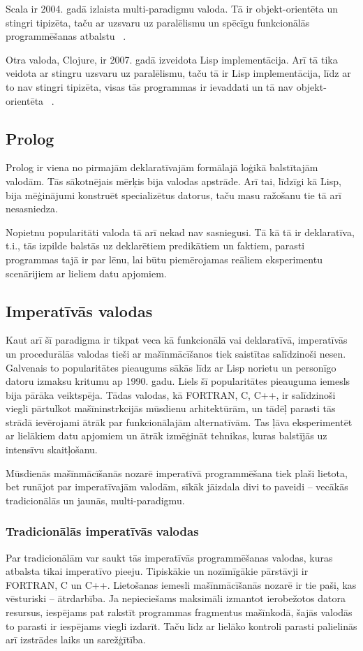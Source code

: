 \documentclass{ludis}
\begin{document}
Scala ir 2004. gadā izlaista multi-paradigmu valoda. Tā ir objekt-orientēta un stingri tipizēta, taču ar uzsvaru uz paralēlismu un spēcīgu funkcionālās programmēšanas atbalstu ~\cite{scala_org}.

Otra valoda, Clojure, ir 2007. gadā izveidota Lisp implementācija. Arī tā tika veidota ar stingru uzsvaru uz paralēlismu, taču tā ir Lisp implementācija, līdz ar to nav stingri tipizēta, visas tās programmas ir ievaddati un tā nav objekt-orientēta ~\cite{clojure_org}.

\subsection{Prolog}
Prolog ir viena no pirmajām deklaratīvajām formālajā loģikā balstītajām valodām. Tās sākotnējais mērķis bija valodas apstrāde. Arī tai, līdzīgi kā Lisp, bija mēģinājumi konstruēt specializētus datorus, taču masu ražošanu tie tā arī nesasniedza.

Nopietnu popularitāti valoda tā arī nekad nav sasniegusi. Tā kā tā ir deklaratīva, t.i., tās izpilde balstās uz deklarētiem predikātiem un faktiem, parasti programmas tajā ir par lēnu, lai būtu piemērojamas reāliem eksperimentu scenārijiem ar lieliem datu apjomiem.

\subsection{Imperatīvās valodas}
 Kaut arī šī paradigma ir tikpat veca kā funkcionālā vai deklaratīvā, imperatīvās un procedurālās valodas tieši ar mašīnmācīšanos tiek saistītas salīdzinoši nesen. Galvenais to popularitātes pieaugums sākās līdz ar Lisp norietu un personīgo datoru izmaksu kritumu ap 1990. gadu. Liels šī popularitātes pieauguma iemesls bija pārāka veiktspēja. Tādas valodas, kā FORTRAN, C, C++, ir salīdzinoši viegli pārtulkot mašīninstrkcijās mūsdienu arhitektūrām, un tādēļ parasti tās strādā ievērojami ātrāk par funkcionālajām alternatīvām. Tas ļāva eksperimentēt ar lielākiem datu apjomiem un ātrāk izmēģināt tehnikas, kuras balstījās uz intensīvu skaitļošanu.

Mūsdienās mašīnmācīšanās nozarē imperatīvā programmēšana tiek plaši lietota, bet runājot par imperatīvajām valodām, sīkāk jāizdala divi to paveidi -- vecākās tradicionālās un jaunās, multi-paradigmu.

\subsubsection{Tradicionālās imperatīvās valodas}
Par tradicionālām var saukt tās imperatīvās programmēšanas valodas, kuras atbalsta tikai imperatīvo pieeju. Tipiskākie un nozīmīgākie pārstāvji ir FORTRAN, C un C++. Lietošanas iemesli mašīnmācīšanās nozarē ir tie paši, kas vēsturiski -- ātrdarbība. Ja nepieciešams maksimāli izmantot ierobežotos datora resursus, iespējams pat rakstīt programmas fragmentus mašīnkodā, šajās valodās to parasti ir iespējams viegli izdarīt. Taču līdz ar lielāko kontroli parasti palielinās arī izstrādes laiks un sarežģītība.
\end{document}
